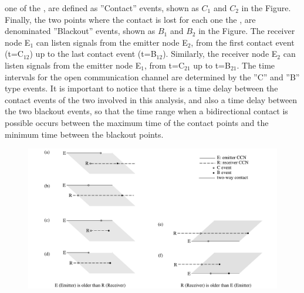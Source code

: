 one of the \cetis{}, are defined as ''Contact'' events, shown as $C_1$
and $C_2$ in the Figure.
%
Finally, the two points where the contact is lost for each one the
\cetis{}, are denominated ''Blackout'' events, shown as $B_1$ and
$B_2$ in the Figure.
%
The receiver node E$_1$ can listen signals from the emitter node
E$_2$, from the first contact event (t=C$_{12}$) up to the last
contact event (t=B$_{12}$).
%
Similarly, the receiver node E$_2$ can listen signals from the emitter
node E$_1$, from t=C$_{21}$ up to t=B$_{21}$.
%
The time intervals for the open communication channel are determined
by the ''C'' and ''B'' type events.
%
It is important to notice that there is a time delay between the
contact events of the two \cetis{} involved in this analysis, and also
a time delay between the two blackout events, so that the time range
when a bidirectional contact is possible occurs between the maximum
time of the contact points and the minimum time between the blackout
points.

      
  
\begin{figure}
   \centering
   \includegraphics[width=\textwidth]{F_messages.pdf}
    \label{F_messages}
\end{figure}  
 
